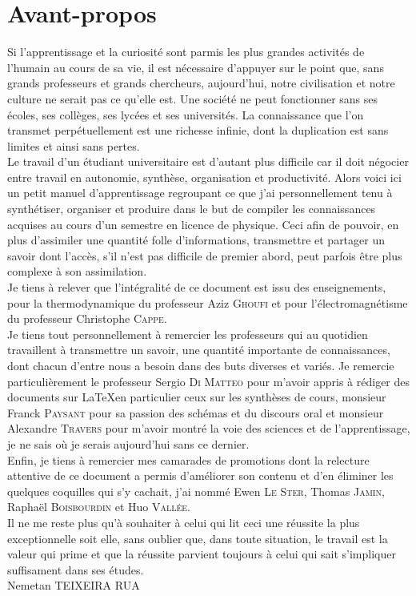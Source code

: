 \chapter*{Avant-propos}


Si l'apprentissage et la curiosité sont parmis les plus grandes activités de l'humain au cours de sa vie, il est nécessaire d'appuyer sur le point que, sans grands professeurs et grands chercheurs, aujourd'hui, notre civilisation et notre culture ne serait pas ce qu'elle est. Une société ne peut fonctionner sans ses écoles, ses collèges, ses lycées et ses universités. La connaissance que l'on transmet perpétuellement est une richesse infinie, dont la duplication est sans limites et ainsi sans pertes. \\

Le travail d'un étudiant universitaire est d'autant plus difficile car il doit négocier entre travail en autonomie, synthèse, organisation et productivité. Alors voici ici un petit manuel d'apprentissage regroupant ce que j'ai personnellement tenu à synthétiser, organiser et produire dans le but de compiler les connaissances acquises au cours d'un semestre en licence de physique. Ceci afin de pouvoir, en plus d'assimiler une quantité folle d'informations, transmettre et partager un savoir dont l'accès, s'il n'est pas difficile de premier abord, peut parfois être plus complexe à son assimilation.\\

Je tiens à relever que l'intégralité de ce document est issu des enseignements, pour la thermodynamique du professeur Aziz \textsc{Ghoufi} et pour l'électromagnétisme du professeur Christophe \textsc{Cappe}.\\

Je tiens tout personnellement à remercier les professeurs qui au quotidien travaillent à transmettre un savoir, une quantité importante de connaissances, dont  chacun d'entre nous a besoin dans des buts diverses et variés. Je remercie particulièrement le professeur Sergio \textsc{Di Matteo} pour m'avoir appris à rédiger des documents sur \LaTeX en particulier ceux sur les synthèses de cours, monsieur Franck \textsc{Paysant} pour sa passion des schémas et du discours oral et monsieur Alexandre \textsc{Travers} pour m'avoir montré la voie des sciences et de l'apprentissage, je ne sais où je serais aujourd'hui sans ce dernier.\\

Enfin, je tiens à remercier mes camarades de promotions dont la relecture attentive de ce document a permis d'améliorer son contenu et d'en éliminer les quelques coquilles qui s'y cachait, j'ai nommé Ewen \textsc{Le Ster}, Thomas \textsc{Jamin}, Raphaël \textsc{Boisbourdin} et Huo \textsc{Vallée}.\\

Il ne me reste plus qu'à souhaiter à celui qui lit ceci une réussite la plus exceptionnelle soit elle, sans oublier que, dans toute situation, le travail est la valeur qui prime et que la réussite parvient toujours à celui qui sait s'impliquer suffisament dans ses études.\\

Nemetan \textsc{TEIXEIRA RUA}
